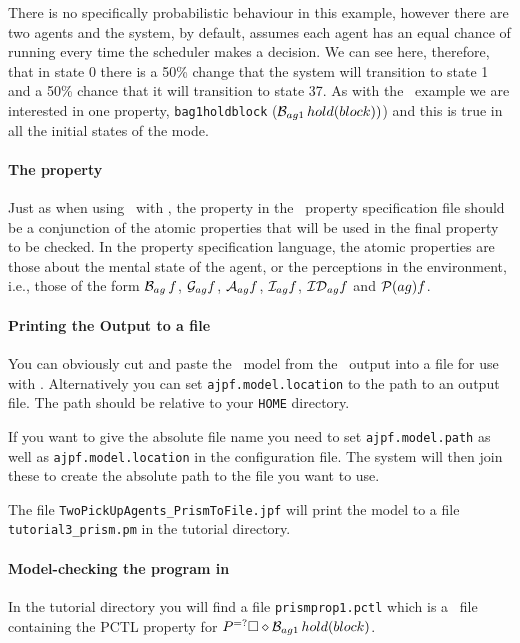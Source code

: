 There is no specifically probabilistic behaviour in this example, however there are two agents and the system, by default, assumes each agent has an equal chance of running every time the scheduler makes a decision.  We can see here, therefore, that in state 0 there is a 50\% change that the system will transition to state 1 and a 50\% chance that it will transition to state 37.  As with the \spin\ example we are interested in one property, \texttt{bag1holdblock} ($\mathrm{{\cal B}}_{ag1} \, hold(block))$) and this is true in all the initial states of the mode.

\paragraph{The property} Just as when using \ajpf\ with \spin, the property in the \ajpf\ property specification file should be a conjunction of the atomic properties that will be used in the final property to be checked.  In the property specification language, the atomic properties are those about the mental state of the agent, or the perceptions in the environment, i.e., those of the form $\mathrm{{\cal B}}_{ag} \, f$, $\mathrm{{\cal G}}_{ag} f$, $\mathrm{{\cal A}}_{ag} f$, $\mathrm{{\cal I}}_{ag} f$, $\mathrm{{\cal ID}}_{ag} f$ and $\mathrm{{\cal P}}(ag){f}$.

\paragraph{Printing the Output to a file} You can obviously cut and paste the \prism\ model from the \ajpf\ output into a file for use with \prism.  Alternatively you can set \texttt{ajpf.model.location} to the path to an output file.  The path should be relative to your \texttt{HOME} directory.  

If you want to give the absolute file name you need to set \texttt{ajpf.model.path} as well as \texttt{ajpf.model.location} in the configuration file.  The system will then join these to create the absolute path to the file you want to use.

The file \texttt{TwoPickUpAgents\_PrismToFile.jpf} will print the model to a file \texttt{tutorial3\_prism.pm} in the tutorial directory.

\paragraph{Model-checking the program in \prism}  In the tutorial directory you will find a file \texttt{prismprop1.pctl} which is a \prism\ file containing the PCTL property for $P^{=?}\Box \diamond \mathrm{{\cal B}}_{ag1} \, hold(block)$. 

